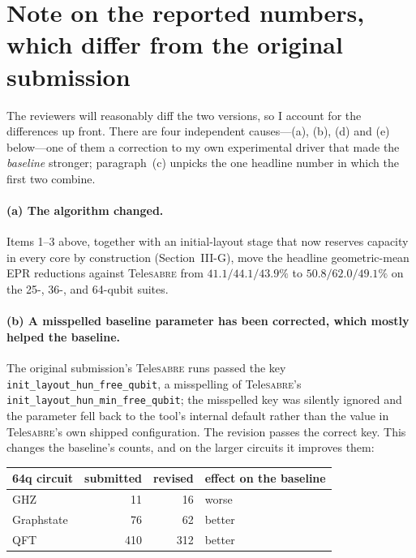 \documentclass[11pt]{article}
\newcommand{\TeleSABRE}{Tele\textsc{sabre}}
\begin{document}
\section*{Note on the reported numbers, which differ from the original
submission}

The reviewers will reasonably diff the two versions, so I account for the
differences up front. There are four independent causes---(a), (b), (d) and (e) below---one of them
a correction to my own experimental driver that made the \emph{baseline}
stronger; paragraph~(c) unpicks the one headline number in which the first two
combine.

\paragraph{(a) The algorithm changed.}
Items 1--3 above, together with an initial-layout stage that now reserves
capacity in every core by construction (Section~III-G), move the headline
geometric-mean EPR reductions against \TeleSABRE{} from $41.1/44.1/43.9\%$ to
$50.8/62.0/49.1\%$ on the 25-, 36-, and 64-qubit suites.

\paragraph{(b) A misspelled baseline parameter has been corrected, which
mostly helped the baseline.}
The original submission's \TeleSABRE{} runs passed the key
\texttt{init\_layout\_hun\_}\allowbreak\texttt{free\_qubit}, a misspelling of
\TeleSABRE{}'s \texttt{init\_layout\_hun\_}\allowbreak\texttt{min\_free\_qubit};
the misspelled key was silently
ignored and the parameter fell back to the tool's internal default rather than
the value in \TeleSABRE{}'s own shipped configuration. The revision passes the
correct key. This changes the baseline's counts, and on the larger circuits it
improves them:

\begin{center}
\begin{tabular}{@{}lrrl@{}}
\toprule
64q circuit & submitted & revised & effect on the baseline \\
\midrule
GHZ        &  11 &  16 & worse \\
Graphstate &  76 &  62 & better \\
QFT        & 410 & 312 & better \\
\bottomrule
\end{tabular}
\end{center}
\end{document}
